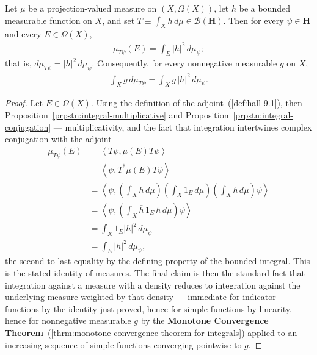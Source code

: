 \begin{lemma}
    \label{lmm:associated-measure-of-image}
    \leanok
    Let $\mu$ be a projection-valued measure on $(X,\Omega(X))$, let $h$ be a bounded measurable function on $X$, and set $T \equiv \int_X h \, d\mu \in \mathcal{B}(\mathbf{H})$. Then for every $\psi \in \mathbf{H}$ and every $E \in \Omega(X)$,
    \begin{align}
        \mu_{T\psi}(E) = \int_E \lvert h \rvert^2 \, d\mu_\psi;
    \end{align}
    that is, $d\mu_{T\psi} = \lvert h \rvert^2 \, d\mu_\psi$. Consequently, for every nonnegative measurable $g$ on $X$,
    \begin{align}
        \int_X g \, d\mu_{T\psi} = \int_X g\,\lvert h \rvert^2 \, d\mu_\psi.
    \end{align}
\end{lemma}
\begin{proof}
    \leanok
Let $E \in \Omega(X)$. Using the definition of the adjoint~(\ref{def:hall-9.1}), then Proposition~\ref{prpstn:integral-multiplicative} and Proposition~\ref{prpstn:integral-conjugation} — multiplicativity, and the fact that integration intertwines complex conjugation with the adjoint —
\begin{align}
    \mu_{T\psi}(E) &= \left< T\psi, \mu(E)T\psi \right> \\
                   &= \left< \psi, T^*\mu(E)T\psi \right> \\
                   &= \left< \psi, \left( \int_X \overline{h}\,d\mu \right)\left( \int_X 1_E \, d\mu \right)\left( \int_X h \, d\mu \right)\psi \right> \\
                   &= \left< \psi, \left( \int_X \overline{h}\,1_E\,h \, d\mu \right)\psi \right> \\
                   &= \int_X 1_E \lvert h \rvert^2 \, d\mu_\psi \\
                   &= \int_E \lvert h \rvert^2 \, d\mu_\psi,
\end{align}
the second-to-last equality by the defining property of the bounded integral. This is the stated identity of measures. The final claim is then the standard fact that integration against a measure with a density reduces to integration against the underlying measure weighted by that density — immediate for indicator functions by the identity just proved, hence for simple functions by linearity, hence for nonnegative measurable $g$ by the \textbf{Monotone Convergence Theorem}~(\ref{thrm:monotone-convergence-theorem-for-integrals}) applied to an increasing sequence of simple functions converging pointwise to $g$.
\end{proof}

